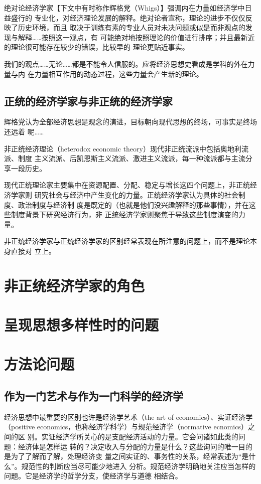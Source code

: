 绝对论经济学家【下文中有时称作辉格党（Whigs）】强调内在力量如经济学中日益盛行的
专业化，对经济理论发展的解释。绝对论者宣称，理论的进步不仅仅反映了历史环境，而且
取决于训练有素的专业人员对未决问题或似是而非观点的发现与解释……按照这一观点，有
可能绝对地按照理论的价值进行排序；并且最新近的理论很可能存在较少的错误，比较早的
理论更贴近事实。

我们的观点……无论……都是不能令人信服的。应将经济思想史看成是学科的外在力量与内
在力量相互作用的动态过程，这些力量会产生新的理论。

\subsection{正统的经济学家与非正统的经济学家}

辉格党认为全部经济思想是观念的演进，目标朝向现代思想的终场，可事实是终场还远着
呢……

非正统经济理论（heterodox economic theory）现代非正统流派中包括奥地利流派、制度
主义流派、后凯恩斯主义流派、激进主义流派，每一种流派都与主流分享一段历史。

现代正统理论家主要集中在资源配置、分配、稳定与增长这四个问题上，非正统经济学家则
研究社会与经济中产生变化的力量。正统经济学家认为具体的社会制度、政治制度与经济制
度是既定的（也就是他们没兴趣解释的那些事情），并在这些制度背景下研究经济行为，非
正统经济学家则聚焦于导致这些制度演变的力量。

非正统经济学家与正统经济学家的区别经常表现在所注意的问题上，而不是理论本身直接对
立上。

\section{非正统经济学家的角色}

\section{呈现思想多样性时的问题}

\section{方法论问题}

\subsection{作为一门艺术与作为一门科学的经济学}

经济思想中最重要的区别也许是经济学艺术（the art of economics）、实证经济学
（positive economics，也称经济学科学）与规范经济学（normative ecnomics）之间的区
别。实证经济学所关心的是支配经济活动的力量。它会问诸如此类的问题：经济体是怎样运
转的？决定收入与分配的力量是什么？这些询问的唯一目的是为了了解而了解，处理经济变
量之间实证的、事务性的关系，经常表述为“是什么”。规范性的判断应当尽可能少地进入
分析。规范经济学明确地关注应当怎样的问题。它是经济学的哲学分支，使经济学与道德
相结合。

